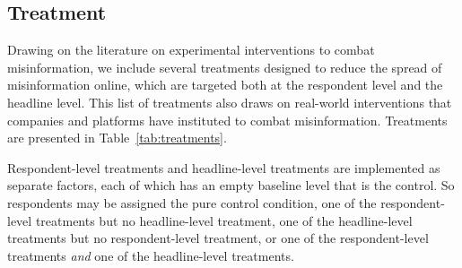\documentclass[letterpaper, 12pt, parskip=full,DIV=10]{scrartcl}
\begin{document}
\subsection{Treatment}
Drawing on the literature on experimental interventions to combat misinformation, we include several treatments designed to reduce the spread of misinformation online, which are targeted both at the respondent level and the headline level. This list of treatments also draws on real-world interventions that companies and platforms have instituted to combat misinformation. Treatments are presented in Table~\ref{tab:treatments}. 

Respondent-level treatments and headline-level treatments are implemented as separate factors, each of which has an empty baseline level that is the control. So respondents may be assigned the pure control condition, one of the respondent-level treatments but no headline-level treatment, one of the headline-level treatments but no respondent-level treatment, or one of the respondent-level treatments \textit{and} one of the headline-level treatments. 
\end{document}
